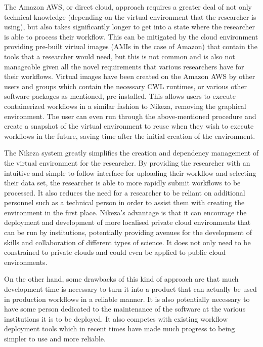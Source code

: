 The Amazon AWS, or direct cloud, approach requires a greater deal of not only technical knowledge (depending on the virtual environment that the researcher is using), but also takes significantly longer to get into a state where the researcher is able to process their workflow. This can be mitigated by the cloud environment providing pre-built virtual images (AMIs in the case of Amazon) that contain the tools that a researcher would need, but this is not common and is also not manageable given all the novel requirements that various researchers have for their workflows. Virtual images have been created on the Amazon AWS by other users and groups which contain the necessary CWL runtimes, or various other software packages as mentioned, pre-installed. This allows users to execute containerized workflows in a similar fashion to Nikeza, removing the graphical environment. The user can even run through the above-mentioned procedure and create a snapshot of the virtual environment to reuse when they wish to execute workflows in the future, saving time after the initial creation of the environment.

The Nikeza system greatly simplifies the creation and dependency management of the virtual environment for the researcher. By providing the researcher with an intuitive and simple to follow interface for uploading their workflow and selecting their data set, the researcher is able to more rapidly submit workflows to be processed. It also reduces the need for a researcher to be reliant on additional personnel such as a technical person in order to assist them with creating the environment in the first place. Nikeza's advantage is that it can encourage the deployment and development of more localised private cloud environments that can be run by institutions, potentially providing avenues for the development of skills and collaboration of different types of science. It does not only need to be constrained to private clouds and could even be applied to public cloud environments.

On the other hand, some drawbacks of this kind of approach are that much development time is necessary to turn it into a product that can actually be used in production workflows in a reliable manner. It is also potentially necessary to have some person dedicated to the maintenance of the software at the various institutions it is to be deployed. It also competes with existing workflow deployment tools which in recent times have made much progress to being simpler to use and more reliable.

